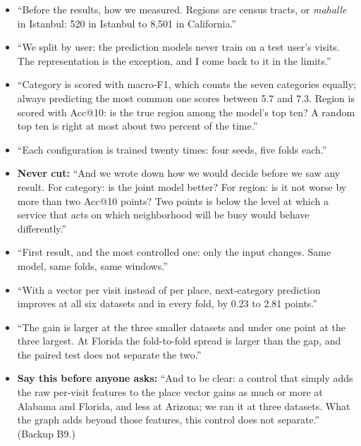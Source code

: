 \say
\begin{itemize}
  \item ``Before the results, how we measured. Regions are census tracts, or \emph{mahalle} in
        Istanbul: 520 in Istanbul to 8,501 in California.''
  \item ``We split by user: the prediction models never train on a test user's visits. The
        representation is the exception, and I come back to it in the limits.''
  \item ``Category is scored with macro-F1, which counts the seven categories equally; always
        predicting the most common one scores between 5.7 and 7.3. Region is scored with Acc@10: is the
        true region among the model's top ten? A random top ten is right at most about two percent of
        the time.''
  \item ``Each configuration is trained twenty times: four seeds, five folds each.''
  \item \textbf{Never cut:} ``And we wrote down how we would decide before we saw any result. For
        category: is the joint model better? For region: is it not worse by more than two Acc@10 points?
        Two points is below the level at which a service that acts on which neighborhood will be busy
        would behave differently.''
\end{itemize}

\say
\begin{itemize}
  \item ``First result, and the most controlled one: only the input changes. Same model, same folds,
        same windows.''
  \item ``With a vector per visit instead of per place, next-category prediction improves at all six
        datasets and in every fold, by 0.23 to 2.81 points.''
  \item ``The gain is larger at the three smaller datasets and under one point at the three largest.
        At Florida the fold-to-fold spread is larger than the gap, and the paired test does not separate
        the two.''
  \item \textbf{Say this before anyone asks:} ``And to be clear: a control that simply adds the raw
        per-visit features to the place vector gains as much or more at Alabama and Florida, and less at
        Arizona; we ran it at three datasets. What the graph adds beyond those features, this control
        does not separate.'' (Backup B9.)
\end{itemize}

